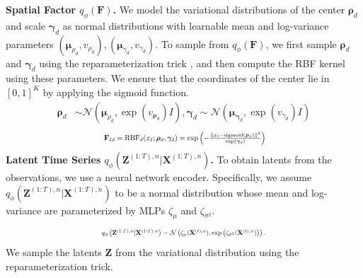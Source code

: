 \textbf{Spatial Factor $q_\phi(\mathbf{F})$.} We model the variational distributions of the center ${\boldsymbol{\rho}_d}$ and scale  ${\boldsymbol{\gamma}_d}$ as normal distributions with learnable mean and log-variance parameters $(\boldsymbol{\mu}_{\rho_d}, v_{\rho_d}), (\boldsymbol{\mu}_{\gamma_d}, v_{\gamma_d})$. To sample from $q_\phi(\mathbf{F})$, we first sample ${\boldsymbol{\rho}_d}$ and ${\boldsymbol{\gamma}_d}$ using the reparameterization trick \citep{kingma2014}, and then compute the RBF kernel using these parameters. We ensure that the coordinates of the center lie in $[0,1]^K$ by applying the sigmoid function.
\begin{align*}
    {\boldsymbol{\rho}_d} &\sim \mathcal{N} \left(\boldsymbol{\mu}_{\rho_d}, \exp \left( v_{\boldsymbol{\rho}_d} \right)I \right), {\boldsymbol{\gamma}_d} \sim \mathcal{N}\left(\boldsymbol{\mu}_{\boldsymbol{\gamma}_d}, \exp \left( v_{\gamma_d} \right) I\right)
\end{align*}
\begin{equation*}
    \resizebox{0.48\textwidth}{!}{
    $\mathbf{F}_{\ell d} = \text{RBF}_d(x_\ell; \boldsymbol{\rho}_d, \boldsymbol{\gamma}_d) = \exp\left( -\frac{||x_\ell - \text{sigmoid}(\boldsymbol{\rho}_d)||^2}{\exp(\boldsymbol{\gamma}_d)} \right)$}
\end{equation*}
\textbf{Latent Time Series $q_{\phi}(\mathbf{Z}^{(1:T), n}|\mathbf{X}^{(1:T), n})$.} To obtain latents from the observations, we use a neural network encoder. Specifically, we assume  $q_\phi(\mathbf{Z}^{(1:T), n}|\mathbf{X}^{(1:T), n})$ to be a normal distribution whose mean and log-variance are parameterized by MLPs $\zeta_\mu$ and $\zeta_{\sigma^2}$. 
\begin{align*}
\resizebox{0.48\textwidth}{!}{$
      q_{\phi} \left(\mathbf{Z}^{(1:T), n}|\mathbf{X}^{(1:T), n}\right) = \mathcal{N} \left(\zeta_\mu(\mathbf{X}^{(t), n}), \exp \left( \zeta_{\sigma^2}(\mathbf{X}^{(t), n})\right) \right).
$}
\end{align*}
We sample the latents $\mathbf{Z}$ from the variational distribution using the reparameterization trick.


